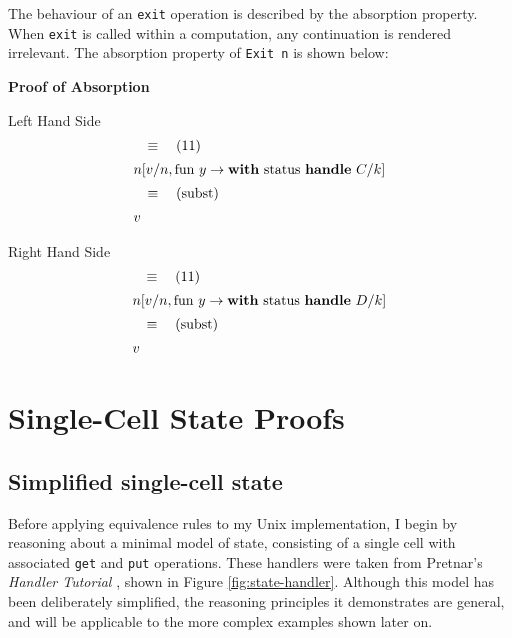 \documentclass[logo,bsc,singlespacing,parskip]{infthesis}
\begin{document}
The behaviour of an \lstinline{exit} operation is described by the absorption property. When \lstinline{exit} is called within a computation, any continuation is rendered irrelevant. The absorption property of \lstinline{Exit n} is shown below:



{\large \textbf{Proof of Absorption}}

{Left Hand Side}
\vspace{0em}
\[
\begin{array}{l}
\quad\equiv\quad (11) \\[5pt]
n [v/n, \text{fun } y \rightarrow \text{\textbf{with} status \textbf{handle} } C/k] \\[5pt]
\quad\equiv\quad (\text{subst}) \\[5pt]
v
\end{array}
\]

{Right Hand Side}
\vspace{-0.2em}
\[
\begin{array}{l}
\quad\equiv\quad (11) \\[5pt]
n [v/n, \text{fun } y \rightarrow \text{\textbf{with} status \textbf{handle} } D/k] \\[5pt]
\quad\equiv\quad (\text{subst}) \\[5pt]
v
\end{array}
\]





\section{Single-Cell State Proofs}

\subsection{Simplified single-cell state}

\label{subsec:simplified-state}
Before applying equivalence rules to my Unix implementation, I begin by reasoning about a minimal model of state, consisting of a single cell with associated \lstinline{get} and \lstinline{put} operations. These handlers were taken from Pretnar's \textit{Handler Tutorial} \cite{pretnar_introduction_2015}, shown in Figure \ref{fig:state-handler}. Although this model has been deliberately simplified, the reasoning principles it demonstrates are general, and will be applicable to the more complex examples shown later on.  
\end{document}
